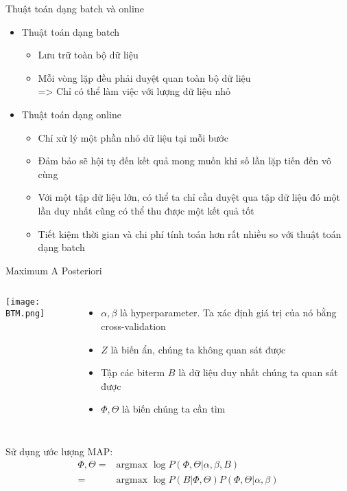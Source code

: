 \documentclass[pdf]{beamer}
\begin{document}
\begin{frame}{Thuật toán dạng batch và online}
	\begin{itemize}
		\item Thuật toán dạng batch
			\begin{itemize}
				\item Lưu trữ toàn bộ dữ liệu
				\item Mỗi vòng lặp đều phải duyệt quan toàn bộ dữ liệu\\
				=> Chỉ có thể làm việc với lượng dữ liệu nhỏ
			\end{itemize}
		\item Thuật toán dạng online
			\begin{itemize}
				\item Chỉ xử lý một phần nhỏ dữ liệu tại mỗi bước
				\item Đảm bảo sẽ hội tụ đến kết quả mong muốn khi số lần lặp tiến đến vô cùng
				\item Với một tập dữ liệu lớn, có thể ta chỉ cần duyệt qua tập dữ liệu đó một lần duy nhất cũng có thể thu được một kết quả tốt
				\item Tiết kiệm thời gian và chi phí tính toán hơn rất nhiều so với thuật toán dạng batch
			\end{itemize}
	\end{itemize}
\end{frame}

\begin{frame}{Maximum A Posteriori}
	\begin{columns}
			\texttt{[image: BTM.png]}
			\begin{itemize}
				\item $\alpha, \beta$ là hyperparameter. Ta xác định giá trị của nó bằng cross-validation
				\item $Z$ là biến ẩn, chúng ta không quan sát được
				\item Tập các biterm $B$ là dữ liệu duy nhất chúng ta quan sát được
				\item $\Phi, \Theta$ là biến chúng ta cần tìm
			\end{itemize}
	\end{columns}
	Sử dụng ước lượng MAP: 
	\begin{align}
		\Phi, \Theta =& \text{argmax\ } \log P(\Phi, \Theta | \alpha, \beta, B)\\
					 =& \text{argmax\ } \log P(B | \Phi, \Theta) P(\Phi, \Theta | \alpha, \beta)
	\end{align}
\end{frame}
\end{document}
